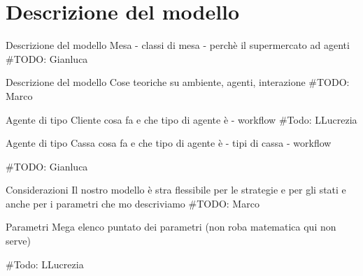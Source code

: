 \section{Descrizione del modello}
\begin{frame}{Descrizione del modello}
	\centering
	Mesa - classi di mesa - perchè il supermercato ad agenti
	#TODO: Gianluca
\end{frame}

\begin{frame}{Descrizione del modello}
	\centering
	Cose teoriche su ambiente, agenti, interazione
	#TODO: Marco

\end{frame}

\begin{frame}{Agente di tipo Cliente}
	\centering
	cosa fa e che tipo di agente è - workflow
	#Todo: LLucrezia
\end{frame}

\begin{frame}{Agente di tipo Cassa}
	\centering
	cosa fa e che tipo di agente è - tipi di cassa - workflow

	#TODO: Gianluca
\end{frame}

\begin{frame}{Considerazioni}
	\centering
	Il nostro modello è stra flessibile per le strategie e per gli stati e anche per i parametri che mo descriviamo
	#TODO: Marco

\end{frame}

\begin{frame}{Parametri}
	\centering
	Mega elenco puntato dei parametri (non roba matematica qui non serve)

	#Todo: LLucrezia
\end{frame}